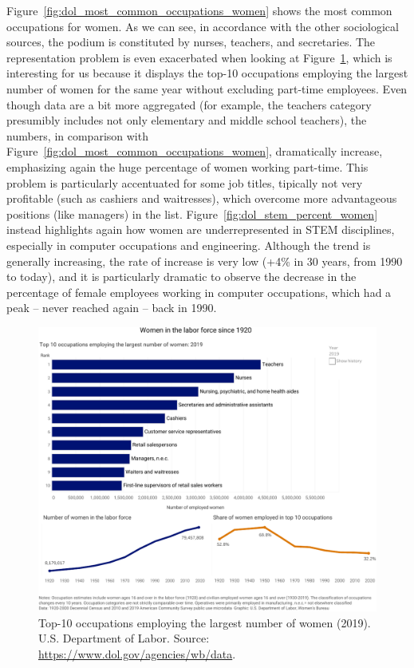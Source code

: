 Figure~\ref{fig:dol_most_common_occupations_women} shows the most common occupations for women. As we can see, in accordance with the other sociological sources, the podium is constituted by nurses, teachers, and secretaries. The representation problem is even exacerbated when looking at Figure~\ref{fig:dol_occupations_over_time}, which is interesting for us because it displays the top-10 occupations employing the largest number of women for the same year without excluding part-time employees. Even though data are a bit more aggregated (for example, the teachers category presumibly includes not only elementary and middle school teachers), the numbers, in comparison with Figure~\ref{fig:dol_most_common_occupations_women}, dramatically increase, emphasizing again the huge percentage of women working part-time. This problem is particularly accentuated for some job titles, tipically not very profitable (such as cashiers and waitresses), which overcome more advantageous positions (like managers) in the list. Figure~\ref{fig:dol_stem_percent_women} instead highlights again how women are underrepresented in STEM disciplines, especially in computer occupations and engineering. Although the trend is generally increasing, the rate of increase is very low (+4\% in 30 years, from 1990 to today), and it is particularly dramatic to observe the decrease in the percentage of female employees working in computer occupations, which had a peak -- never reached again -- back in 1990.

\begin{figure}[t!]
\includegraphics[scale=.7]{figures/dol_occupations_over_time.pdf}
\centering
\caption{Top-10 occupations employing the largest number of women (2019).\newline
U.S. Department of Labor. Source: \upshape\protect\url{https://www.dol.gov/agencies/wb/data}.}
\label{fig:dol_occupations_over_time}
\end{figure}

